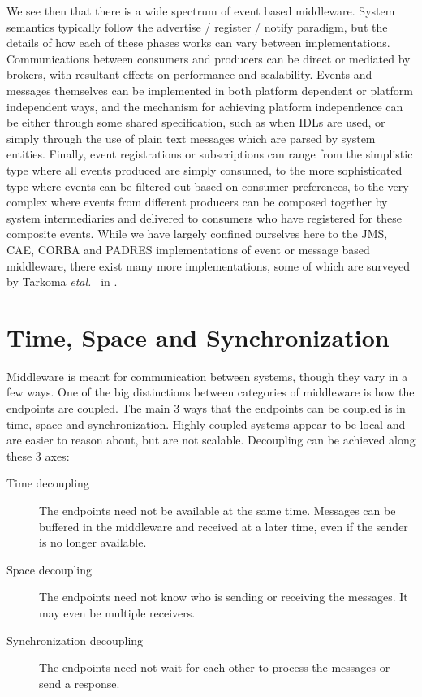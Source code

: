 \documentclass{acm_proc_article-sp}
\begin{document}
We see then that there is a wide spectrum of event based middleware. System semantics typically follow the advertise / register / notify paradigm, but the details of how each of these phases works can vary between implementations. Communications between consumers and producers can be direct or mediated by brokers, with resultant effects on performance and scalability. Events and messages themselves can be implemented in both platform dependent or platform independent ways, and the mechanism for achieving platform independence can be either through some shared specification, such as when IDLs are used, or simply through the use of plain text messages which are parsed by system entities. Finally, event registrations or subscriptions can range from the simplistic type where all events produced are simply consumed, to the more sophisticated type where events can be filtered out based on consumer preferences, to the very complex where events from different producers can be composed together by system intermediaries and delivered to consumers who have registered for these composite events. While we have largely confined ourselves here to the JMS, CAE, CORBA and PADRES implementations of event or message based middleware, there exist many more implementations, some of which are surveyed by Tarkoma {\it etal.\ } in \cite{Tarkoma:2006p6862}.



\section{Time, Space and Synchronization}


Middleware is meant for communication between systems, though they vary in a few ways. One of the big distinctions between categories of middleware is how the endpoints are coupled. The main 3 ways that the endpoints can be coupled is in time, space and synchronization. Highly coupled systems appear to be local and are easier to reason about, but are not scalable. Decoupling can be achieved along these 3 axes:

\begin{description}
\item[Time decoupling] The endpoints need not be available at the same time. Messages can be buffered in the middleware and received at a later time, even if the sender is no longer available.
\item[Space decoupling] The endpoints need not know who is sending or receiving the messages. It may even be multiple receivers.
\item[Synchronization decoupling] The endpoints need not wait for each other to process the messages or send a response.
\end{description}
\end{document}
